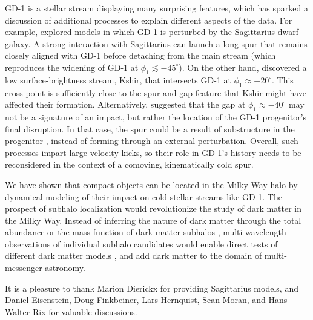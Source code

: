 \documentclass[twocolumn]{aastex63}
\begin{document}
GD-1 is a stellar stream displaying many surprising features, which has sparked a discussion of additional processes to explain different aspects of the data.
For example, \citet{deboer2019} explored models in which GD-1 is perturbed by the Sagittarius dwarf galaxy.
A strong interaction with Sagittarius can launch a long spur that remains closely aligned with GD-1 before detaching from the main stream (which reproduces the widening of GD-1 at $\phi_1\lesssim-45^\circ$).
On the other hand, \citet{malhan2019c} discovered a low surface-brightness stream, Kshir, that intersects GD-1 at $\phi_1\approx-20^\circ$.
This cross-point is sufficiently close to the spur-and-gap feature that Kshir might have affected their formation.
Alternatively, \citet{webb2019} suggested that the gap at $\phi_1\approx-40^\circ$ may not be a signature of an impact, but rather the location of the GD-1 progenitor's final disruption.
In that case, the spur could be a result of substructure in the progenitor \citep[e.g.,][]{carlberg2018}, instead of forming through an external perturbation.
Overall, such processes impart large velocity kicks, so their role in GD-1's history needs to be reconsidered in the context of a comoving, kinematically cold spur.


We have shown that compact objects can be located in the Milky Way halo by dynamical modeling of their impact on cold stellar streams like GD-1.
The prospect of subhalo localization would revolutionize the study of dark matter in the Milky Way.
Instead of inferring the nature of dark matter through the total abundance \citep[e.g.,][]{carlberg2013} or the mass function of dark-matter subhalos \citep[e.g.,][]{banik2019}, multi-wavelength observations of individual subhalo candidates would enable direct tests of different dark matter models \citep[e.g.,][]{daylan2016}, and add dark matter to the domain of multi-messenger astronomy.


It is a pleasure to thank Marion Dierickx for providing Sagittarius models, and Daniel Eisenstein, Doug Finkbeiner, Lars Hernquist, Sean Moran, and Hans-Walter Rix for valuable discussions.
\end{document}
